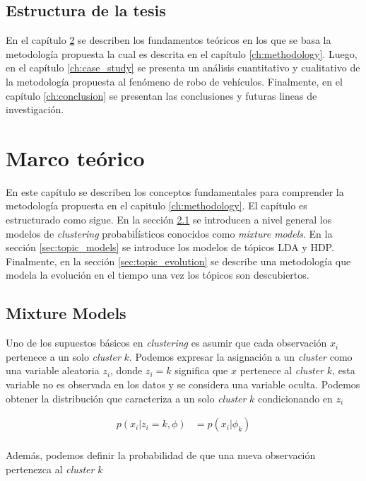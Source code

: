 \documentclass[letterpaper,12pt,oneside]{book} %
\begin{document}
\section{Estructura de la tesis}
En el capítulo \ref{ch:theorethical_framework} se describen los fundamentos teóricos en los que se basa la metodología propuesta la cual es descrita en el capítulo \ref{ch:methodology}. Luego, en el capítulo \ref{ch:case_study} se presenta un análisis cuantitativo y cualitativo de la metodología propuesta al fenómeno de robo de vehículos. Finalmente, en el capítulo \ref{ch:conclusion} se presentan las conclusiones y futuras lineas de investigación.

\chapter{Marco teórico}
\label{ch:theorethical_framework}

En este capítulo se describen los conceptos fundamentales para comprender la metodología propuesta en el capitulo \ref{ch:methodology}. El capítulo es estructurado como sigue. En la sección \ref{sec:mixture_models} se introducen a nivel general los modelos de \textit{clustering} probabiĺísticos conocidos como \textit{mixture models}. En la sección \ref{sec:topic_models} se introduce los modelos de tópicos LDA y HDP. Finalmente, en la sección \ref{sec:topic_evolution} se describe una metodología que modela la evolución en el tiempo una vez los tópicos son descubiertos. 

\section{Mixture Models}
\label{sec:mixture_models}

Uno de los supuestos básicos en \textit{clustering} es asumir que cada observación $x_{i}$ pertenece a un solo \textit{cluster} $k$. Podemos expresar la asignación a un \textit{cluster} como una variable aleatoria $z_{i}$, donde $z_{i}=k$ significa que $x$ pertenece al \textit{cluster} $k$, esta variable no es observada en los datos y se considera una variable oculta. Podemos obtener la distribución que caracteriza a un solo \textit{cluster} $k$ condicionando en $z_{i}$

\begin{align}
    p(x_{i}|z_{i}=k, \phi) & = p(x_{i}|\phi_{k})\\
\end{align}

Además, podemos definir la probabilidad de que una nueva observación pertenezca al \textit{cluster} $k$ 
\end{document}
